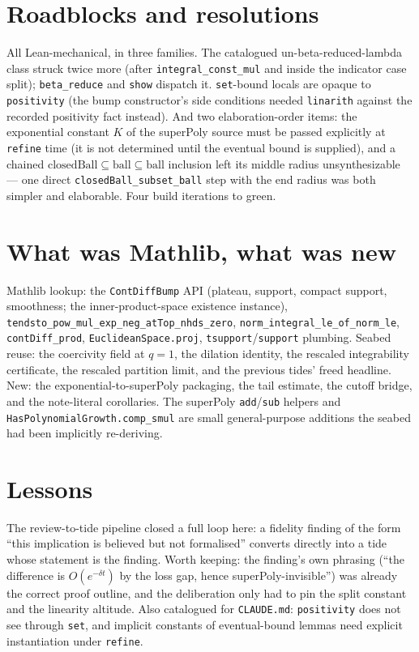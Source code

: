 \documentclass[11pt]{article}
\begin{document}
\section{Roadblocks and resolutions}

All Lean-mechanical, in three families. The catalogued un-beta-reduced-lambda
class struck twice more (after \texttt{integral\_const\_mul} and inside the
indicator case split); \texttt{beta\_reduce} and \texttt{show} dispatch it.
\texttt{set}-bound locals are opaque to \texttt{positivity} (the bump
constructor's side conditions needed \texttt{linarith} against the recorded
positivity fact instead). And two elaboration-order items: the exponential
constant $K$ of the superPoly source must be passed explicitly at
\texttt{refine} time (it is not determined until the eventual bound is
supplied), and a chained
$\mathrm{closedBall} \subseteq \mathrm{ball} \subseteq \mathrm{ball}$
inclusion left its middle radius unsynthesizable --- one direct
\texttt{closedBall\_subset\_ball} step with the end radius was both simpler
and elaborable. Four build iterations to green.

\section{What was Mathlib, what was new}

Mathlib lookup: the \texttt{ContDiffBump} API (plateau, support, compact
support, smoothness; the inner-product-space existence instance),
\texttt{tendsto\_pow\_mul\_exp\_neg\_atTop\_nhds\_zero},
\texttt{norm\_integral\_le\_of\_norm\_le}, \texttt{contDiff\_prod},
\texttt{EuclideanSpace.proj}, \texttt{tsupport}/\texttt{support} plumbing.
Seabed reuse: the coercivity field at $q = 1$, the dilation identity, the
rescaled integrability certificate, the rescaled partition limit, and the
previous tides' freed headline. New: the exponential-to-superPoly packaging,
the tail estimate, the cutoff bridge, and the note-literal corollaries. The
superPoly \texttt{add}/\texttt{sub} helpers and
\texttt{HasPolynomialGrowth.comp\_smul} are small general-purpose additions
the seabed had been implicitly re-deriving.

\section{Lessons}

The review-to-tide pipeline closed a full loop here: a fidelity finding of
the form ``this implication is believed but not formalised'' converts
directly into a tide whose statement is the finding. Worth keeping: the
finding's own phrasing (``the difference is $O(e^{-\delta t})$ by the loss
gap, hence superPoly-invisible'') was already the correct proof outline, and
the deliberation only had to pin the split constant and the linearity
altitude. Also catalogued for \texttt{CLAUDE.md}: \texttt{positivity} does
not see through \texttt{set}, and implicit constants of eventual-bound
lemmas need explicit instantiation under \texttt{refine}.
\end{document}
